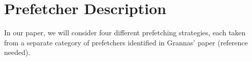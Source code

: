 
\section{Prefetcher Description}
\label{sec:prefetcherDescription}

In our paper, we will consider four different prefetching strategies,
each taken from a separate category of prefetchers identified in
Grannas' paper (reference needed).





